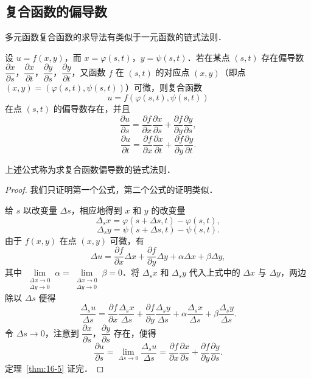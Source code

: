 \subsection{复合函数的偏导数}

多元函数复合函数的求导法有类似于一元函数的链式法则．

\begin{theorem}\label{thm:16-5}
设 $u=f(x,y)$，而 $x=\varphi(s,t)$，$y=\psi(s,t)$．若在某点 $(s,t)$ 存在偏导数 $\dfrac{\partial x}{\partial s}$，$\dfrac{\partial x}{\partial t}$，$\dfrac{\partial y}{\partial s}$，$\dfrac{\partial y}{\partial t}$，又函数 $f$ 在 $(s,t)$ 的对应点 $(x,y)$（即点 $(x,y)=(\varphi(s,t),\psi(s,t))$）可微，则复合函数
\[
u=f(\varphi(s,t),\psi(s,t))
\]
在点 $(s,t)$ 的偏导数存在，并且
\[
\frac{\partial u}{\partial s}=\frac{\partial f}{\partial x}\frac{\partial x}{\partial s}+\frac{\partial f}{\partial y}\frac{\partial y}{\partial s},
\]
\[
\frac{\partial u}{\partial t}=\frac{\partial f}{\partial x}\frac{\partial x}{\partial t}+\frac{\partial f}{\partial y}\frac{\partial y}{\partial t}.
\]
\end{theorem}

上述公式称为求复合函数偏导数的链式法则．

\begin{proof}
我们只证明第一个公式，第二个公式的证明类似．

给 $s$ 以改变量 $\Delta s$，相应地得到 $x$ 和 $y$ 的改变量
\[
\Delta_{s}x=\varphi(s+\Delta s,t)-\varphi(s,t),
\]
\[
\Delta_{s}y=\psi(s+\Delta s,t)-\psi(s,t).
\]
由于 $f(x,y)$ 在点 $(x,y)$ 可微，有
\[
\Delta u=\frac{\partial f}{\partial x}\Delta x+\frac{\partial f}{\partial y}\Delta y+\alpha\Delta x+\beta\Delta y,
\]
其中 $\lim\limits_{\substack{\Delta x\to 0\\ \Delta y\to 0}}\alpha=\lim\limits_{\substack{\Delta x\to 0\\ \Delta y\to 0}}\beta=0$．将 $\Delta_{s}x$ 和 $\Delta_{s}y$ 代入上式中的 $\Delta x$ 与 $\Delta y$，两边除以 $\Delta s$ 便得
\[
\frac{\Delta_{s}u}{\Delta s}=\frac{\partial f}{\partial x}\frac{\Delta_{s}x}{\Delta s}+\frac{\partial f}{\partial y}\frac{\Delta_{s}y}{\Delta s}+\alpha\frac{\Delta_{s}x}{\Delta s}+\beta\frac{\Delta_{s}y}{\Delta s}.
\]
令 $\Delta s\to 0$，注意到 $\dfrac{\partial x}{\partial s}$，$\dfrac{\partial y}{\partial s}$ 存在，便得
\[
\frac{\partial u}{\partial s}=\lim_{\Delta s\to 0}\frac{\Delta_{s}u}{\Delta s}=\frac{\partial f}{\partial x}\frac{\partial x}{\partial s}+\frac{\partial f}{\partial y}\frac{\partial y}{\partial s}.
\]
定理~\ref{thm:16-5} 证完．
\end{proof}

